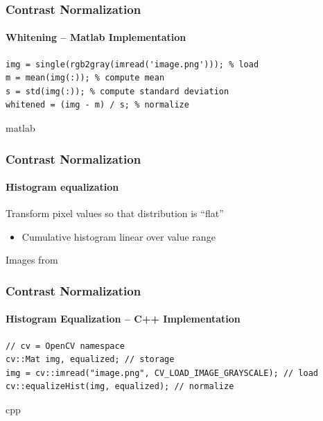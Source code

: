 \documentclass[xetex,professionalfont]{beamer}
\begin{document}

\begin{frame}[fragile]
\frametitle{Contrast Normalization}
\framesubtitle{Whitening -- Matlab Implementation}

\begin{verbatim}
img = single(rgb2gray(imread('image.png'))); % load
m = mean(img(:)); % compute mean
s = std(img(:)); % compute standard deviation
whitened = (img - m) / s; % normalize
\end{verbatim}{matlab}

\end{frame}


\begin{frame}
\frametitle{Contrast Normalization}
\framesubtitle{Histogram equalization}

Transform pixel values so that distribution is \enquote{flat} %
\begin{itemize}
	\item Cumulative histogram linear over value range %
\end{itemize}

\medskip
\begin{center}
	{\centering Images from \cite{prince12}}
\end{center}

\end{frame}


\begin{frame}[fragile]
\frametitle{Contrast Normalization}
\framesubtitle{Histogram Equalization -- C++ Implementation}

\begin{verbatim}
// cv = OpenCV namespace
cv::Mat img, equalized; // storage
img = cv::imread("image.png", CV_LOAD_IMAGE_GRAYSCALE); // load
cv::equalizeHist(img, equalized); // normalize
\end{verbatim}{cpp}

\end{frame}
\end{document}
